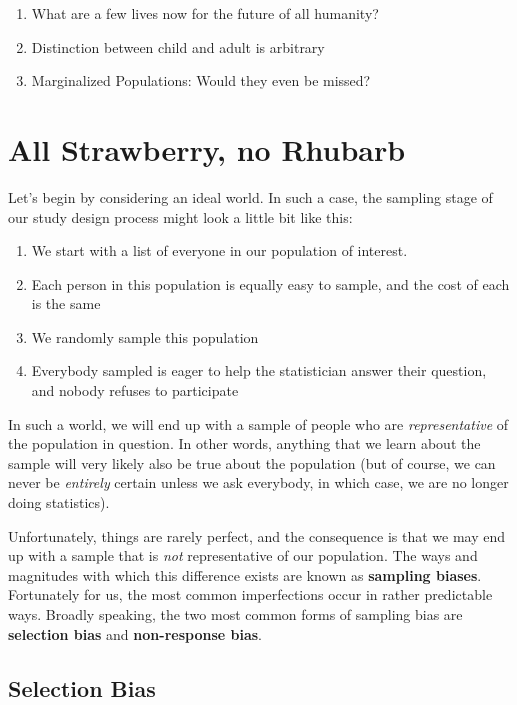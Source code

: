\documentclass[
]{book}
\providecommand{\tightlist}{%
  \setlength{\itemsep}{0pt}\setlength{\parskip}{0pt}}
\theoremstyle{definition}
\theoremstyle{definition}
\theoremstyle{definition}
\theoremstyle{remark}
\begin{document}
\begin{enumerate}
\def\labelenumi{\roman{enumi}.}
\tightlist
\item
  What are a few lives now for the future of all humanity?
\item
  Distinction between child and adult is arbitrary
\item
  Marginalized Populations: Would they even be missed?
\end{enumerate}

\hypertarget{all-strawberry-no-rhubarb}{%
\section{All Strawberry, no Rhubarb}\label{all-strawberry-no-rhubarb}}

Let's begin by considering an ideal world. In such a case, the sampling stage of our study design process might look a little bit like this:

\begin{enumerate}
\def\labelenumi{\arabic{enumi}.}
\tightlist
\item
  We start with a list of everyone in our population of interest.
\item
  Each person in this population is equally easy to sample, and the cost of each is the same
\item
  We randomly sample this population
\item
  Everybody sampled is eager to help the statistician answer their question, and nobody refuses to participate
\end{enumerate}

In such a world, we will end up with a sample of people who are \emph{representative} of the population in question. In other words, anything that we learn about the sample will very likely also be true about the population (but of course, we can never be \emph{entirely} certain unless we ask everybody, in which case, we are no longer doing statistics).

Unfortunately, things are rarely perfect, and the consequence is that we may end up with a sample that is \emph{not} representative of our population. The ways and magnitudes with which this difference exists are known as \textbf{sampling biases}. Fortunately for us, the most common imperfections occur in rather predictable ways. Broadly speaking, the two most common forms of sampling bias are \textbf{selection bias} and \textbf{non-response bias}.

\hypertarget{selection-bias}{%
\subsection{Selection Bias}\label{selection-bias}}
\end{document}
